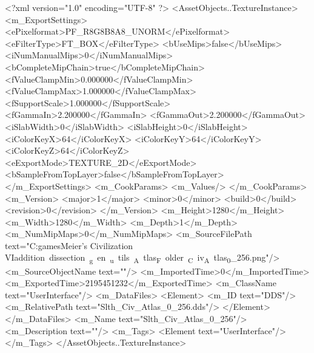 <?xml version="1.0" encoding="UTF-8" ?>
<AssetObjects..TextureInstance>
	<m_ExportSettings>
		<ePixelformat>PF_R8G8B8A8_UNORM</ePixelformat>
		<eFilterType>FT_BOX</eFilterType>
		<bUseMips>false</bUseMips>
		<iNumManualMips>0</iNumManualMips>
		<bCompleteMipChain>true</bCompleteMipChain>
		<fValueClampMin>0.000000</fValueClampMin>
		<fValueClampMax>1.000000</fValueClampMax>
		<fSupportScale>1.000000</fSupportScale>
		<fGammaIn>2.200000</fGammaIn>
		<fGammaOut>2.200000</fGammaOut>
		<iSlabWidth>0</iSlabWidth>
		<iSlabHeight>0</iSlabHeight>
		<iColorKeyX>64</iColorKeyX>
		<iColorKeyY>64</iColorKeyY>
		<iColorKeyZ>64</iColorKeyZ>
		<eExportMode>TEXTURE_2D</eExportMode>
		<bSampleFromTopLayer>false</bSampleFromTopLayer>
	</m_ExportSettings>
	<m_CookParams>
		<m_Values/>
	</m_CookParams>
	<m_Version>
		<major>1</major>
		<minor>0</minor>
		<build>0</build>
		<revision>0</revision>
	</m_Version>
	<m_Height>1280</m_Height>
	<m_Width>1280</m_Width>
	<m_Depth>1</m_Depth>
	<m_NumMipMaps>0</m_NumMipMaps>
	<m_SourceFilePath text="C:\Users\Sam\Documents\my games\Sid Meier's Civilization VI\Mods\unit addition dissection\python_gen\build_utils\CIV_Atlas_Folder\Slth_Civ_Atlas_0_256.png"/>
	<m_SourceObjectName text=""/>
	<m_ImportedTime>0</m_ImportedTime>
	<m_ExportedTime>2195451232</m_ExportedTime>
	<m_ClassName text="UserInterface"/>
	<m_DataFiles>
		<Element>
			<m_ID text="DDS"/>
			<m_RelativePath text="Slth_Civ_Atlas_0_256.dds"/>
		</Element>
	</m_DataFiles>
	<m_Name text="Slth_Civ_Atlas_0_256"/>
	<m_Description text=""/>
	<m_Tags>
		<Element text="UserInterface"/>
	</m_Tags>
</AssetObjects..TextureInstance>

